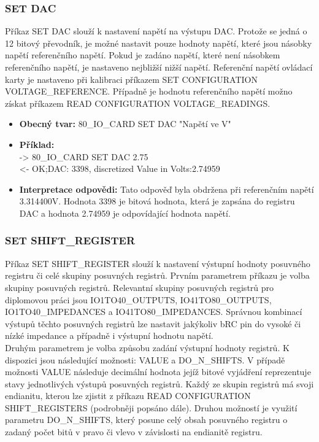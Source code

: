 \subsubsection{SET DAC}
Příkaz SET DAC slouží k nastavení napětí na výstupu DAC. Protože se jedná o 12 bitový převodník, je možné nastavit pouze hodnoty napětí, které jsou násobky
napětí referenčního napětí. Pokud je zadáno napětí, které není násobkem referenčního napětí, je nastaveno nejbližší nižší napětí.
Referenční napětí ovládací karty je nastaveno při kalibraci příkazem SET CONFIGURATION VOLTAGE\_REFERENCE. Případně je hodnotu referenčního napětí možno získat
příkazem READ CONFIGURATION VOLTAGE\_READINGS.
\begin{itemize}[leftmargin=*]
    \item \textbf{Obecný tvar:} 80\_IO\_CARD SET DAC "Napětí ve V"
    \item \textbf{Příklad:}\\
    -> 80\_IO\_CARD SET DAC 2.75\\
    <- OK;DAC: 3398, discretized Value in Volts:2.74959
    \item \textbf{Interpretace odpovědi:} Tato odpověď byla obdržena při referenčním napětí 3.314400V. Hodnota 3398 je bitová hodnota, která je zapsána do registru DAC a
    hodnota 2.74959 je odpovídající hodnota napětí.
\end{itemize}

\subsubsection{SET SHIFT\_REGISTER}
Příkaz SET SHIFT\_REGISTER slouží k nastavení výstupní hodnoty posuvného registru či celé skupiny posuvných registrů.
Prvním parametrem příkazu je volba skupiny posuvných registrů.
Relevantní skupiny posuvných registrů pro diplomovou práci jsou IO1TO40\_OUTPUTS, IO41TO80\_OUTPUTS, IO1TO40\_IMPEDANCES a IO41TO80\_IMPEDANCES.
Správnou kombinací výstupů těchto posuvných registrů lze nastavit jakýkoliv bRC pin do vysoké či nízké impedance a případně i výstupní hodnotu napětí.\\

Druhým parametrem je volba způsobu zadání výstupní hodnoty registrů. K dispozici jsou následující možnosti: VALUE a DO\_N\_SHIFTS.
V případě možnosti VALUE následuje decimální hodnota jejíž bitové vyjádření reprezentuje stavy jednotlivých výstupů posuvných registrů.
Každý ze skupin registrů má svoji endianitu, kterou lze zjistit z příkazu READ CONFIGURATION SHIFT\_REGISTERS (podrobněji popsáno dále). 
Druhou možností je využití parametru DO\_N\_SHIFTS, který posune celý obsah posuvného registru o zadaný počet bitů v pravo či vlevo v závislosti na endianitě registru.

